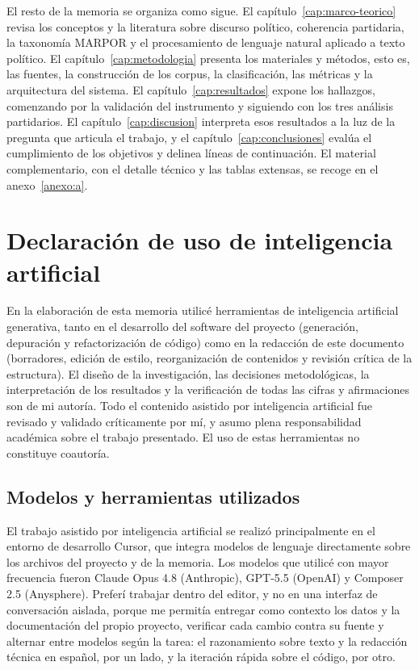 El resto de la memoria se organiza como sigue. El
capítulo~\ref{cap:marco-teorico} revisa los conceptos y la literatura sobre
discurso político, coherencia partidaria, la taxonomía MARPOR y el procesamiento
de lenguaje natural aplicado a texto político. El
capítulo~\ref{cap:metodologia} presenta los materiales y métodos, esto es, las
fuentes, la construcción de los corpus, la clasificación, las métricas y la
arquitectura del sistema. El capítulo~\ref{cap:resultados} expone los hallazgos,
comenzando por la validación del instrumento y siguiendo con los tres análisis
partidarios. El capítulo~\ref{cap:discusion} interpreta esos resultados a la luz
de la pregunta que articula el trabajo, y el capítulo~\ref{cap:conclusiones}
evalúa el cumplimiento de los objetivos y delinea líneas de continuación. El
material complementario, con el detalle técnico y las tablas extensas, se recoge
en el anexo~\ref{anexo:a}.

\section{Declaración de uso de inteligencia artificial}
\label{sec:declaracion-ia}

En la elaboración de esta memoria utilicé herramientas de inteligencia artificial
generativa, tanto en el desarrollo del software del proyecto (generación,
depuración y refactorización de código) como en la redacción de este documento
(borradores, edición de estilo, reorganización de contenidos y revisión crítica
de la estructura). El diseño de la investigación, las decisiones metodológicas,
la interpretación de los resultados y la verificación de todas las cifras y
afirmaciones son de mi autoría. Todo el contenido asistido por inteligencia
artificial fue revisado y validado críticamente por mí, y asumo plena
responsabilidad académica sobre el trabajo presentado. El uso de estas
herramientas no constituye coautoría.

\subsection*{Modelos y herramientas utilizados}

El trabajo asistido por inteligencia artificial se realizó principalmente en el
entorno de desarrollo Cursor, que integra modelos de lenguaje directamente sobre
los archivos del proyecto y de la memoria. Los modelos que utilicé con mayor
frecuencia fueron Claude Opus 4.8 (Anthropic), GPT-5.5 (OpenAI) y Composer 2.5
(Anysphere). Preferí trabajar dentro del editor, y no en una interfaz de
conversación aislada, porque me permitía entregar como contexto los datos y la
documentación del propio proyecto, verificar cada cambio contra su fuente y
alternar entre modelos según la tarea: el razonamiento sobre texto y la redacción
técnica en español, por un lado, y la iteración rápida sobre el código, por otro.

